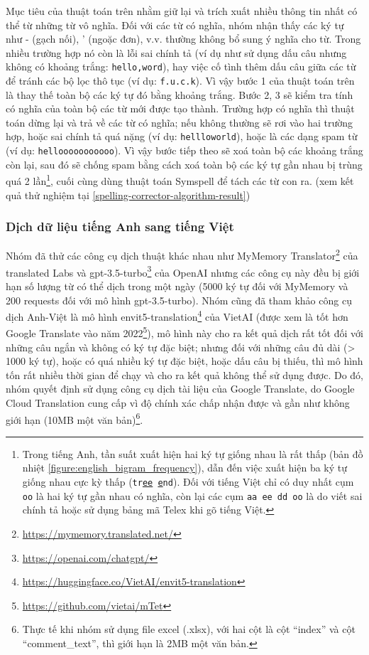 Mục tiêu của thuật toán trên nhằm giữ lại và trích xuất nhiều thông tin nhất có thể từ những từ vô nghĩa. Đối với các từ có nghĩa, nhóm nhận thấy các ký tự như - (gạch nối), ' (ngoặc đơn), v.v. thường không bổ sung ý nghĩa cho từ. Trong nhiều trường hợp nó còn là lỗi sai chính tả (ví dụ như sử dụng dấu câu nhưng không có khoảng trắng: \texttt{hello,word}), hay việc cố tình thêm dấu câu giữa các từ để tránh các bộ lọc thô tục (ví dụ: \texttt{f.u.c.k}). Vì vậy bước 1 của thuật toán trên là thay thế toàn bộ các ký tự đó bằng khoảng trắng. Bước 2, 3 sẽ kiểm tra tính có nghĩa của toàn bộ các từ mới được tạo thành. Trường hợp có nghĩa thì thuật toán dừng lại và trả về các từ có nghĩa; nếu không thường sẽ rơi vào hai trường hợp, hoặc sai chính tả quá nặng (ví dụ: \texttt{hel\textvisiblespace llowo\textvisiblespace rld}), hoặc là các dạng spam từ (ví dụ: \texttt{hellooooooooooo}). Vì vậy bước tiếp theo sẽ xoá toàn bộ các khoảng trắng còn lại, sau đó sẽ chống spam bằng cách xoá toàn bộ các ký tự gần nhau bị trùng quá 2 lần\footnote{Trong tiếng Anh, tần suất xuất hiện hai ký tự giống nhau là rất thấp (bản đồ nhiệt \ref{figure:english_bigram_frequency}), dẫn đến việc xuất hiện ba ký tự giống nhau cực kỳ thấp (\texttt{tr\underline{ee} \underline{e}nd}). Đối với tiếng Việt chỉ có duy nhất cụm \texttt{oo} là hai ký tự gần nhau có nghĩa, còn lại các cụm \texttt{aa ee dd oo} là do viết sai chính tả hoặc sử dụng bảng mã Telex khi gõ tiếng Việt.}, cuối cùng dùng thuật toán Symspell để tách các từ con ra. (xem kết quả thử nghiệm tại \ref{spelling-corrector-algorithm-result})

\subsubsection{Dịch dữ liệu tiếng Anh sang tiếng Việt}
Nhóm đã thử các công cụ dịch thuật khác nhau như MyMemory Translator\footnote{\url{https://mymemory.translated.net/}} của translated Labs và gpt-3.5-turbo\footnote{\url{https://openai.com/chatgpt/}} của OpenAI nhưng các công cụ này đều bị giới hạn số lượng từ có thể dịch trong một ngày (5000 ký tự đối với MyMemory và 200 requests đối với mô hình gpt-3.5-turbo). Nhóm cũng đã tham khảo công cụ dịch Anh-Việt là mô hình envit5-translation\footnote{\url{https://huggingface.co/VietAI/envit5-translation}} của VietAI (được xem là tốt hơn Google Translate vào năm 2022\footnote{\url{https://github.com/vietai/mTet}}), mô hình này cho ra kết quả dịch rất tốt đối với những câu ngắn và không có ký tự đặc biệt; nhưng đối với những câu đủ dài (> 1000 ký tự), hoặc có quá nhiều ký tự đặc biệt, hoặc dấu câu bị thiếu, thì mô hình tốn rất nhiều thời gian để chạy và cho ra kết quả không thể sử dụng được. Do đó, nhóm quyết định sử dụng công cụ dịch tài liệu của Google Translate, do Google Cloud Translation cung cấp vì độ chính xác chấp nhận được và gần như không giới hạn (10MB một văn bản)\footnote{Thực tế khi nhóm sử dụng file excel (.xlsx), với hai cột là cột ``index'' và cột ``comment\_text'', thì giới hạn là 2MB một văn bản.}.

